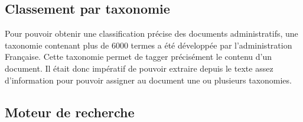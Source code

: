 \subsection{Classement par taxonomie}
Pour pouvoir obtenir une classification précise des documents administratifs, une taxonomie contenant plus de 6000 termes a été développée par l'administration Française. Cette taxonomie permet de tagger précisément le contenu d'un document.
Il était donc impératif de pouvoir extraire depuis le texte assez d'information pour pouvoir assigner au document une ou plusieurs taxonomies.

\subsection{Moteur de recherche}

